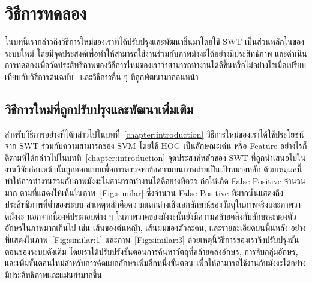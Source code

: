 \chapter{วิธีการทดลอง}
\label{chapter:experiment}

ในบทนี้เรากล่าวถึงวิธีการใหม่ของเราที่ได้ปรับปรุงและพัฒนาขึ้นมาโดยใช้ SWT เป็นส่วนหลักในของระบบใหม่ โดยมีจุดประสงค์เพื่อทำให้สามารถใช้งานร่วมกับภาพมังงะได้อย่างมีประสิทธิภาพ และดำเนินการทดลองเพื่อวัดประสิทธิภาพของวิธีการใหม่ของเราว่าสามารถทำงานได้ดีขึ้นหรือไม่อย่างไรเมื่อเปรียบเทียบกับวิธีการต้นฉบับ~\cite{5540041} และวิธีการอื่น ๆ ที่ถูกพัฒนามาก่อนหน้า

\section{วิธีการใหม่ที่ถูกปรับปรุงและพัฒนาเพิ่มเติม}

สำหรับวิธีการอย่างที่ได้กล่าวไปในบทที่~\ref{chapter:introduction} วิธีการใหม่ของเราได้ใช้ประโยชน์จาก SWT ร่วมกับความสามารถของ SVM โดยใช้ HOG เป็นลักษณะเด่น หรือ Feature อย่างไรก็ดีตามที่ได้กล่าวไปในบทที่~\ref{chapter:introduction} จุดประสงค์หลักของ SWT ที่ถูกนำเสนอไปในงานวิจัยก่อนหน้านั้นถูกออกแบบเพื่อการตรวจหาข้อความบนภาพถ่ายเป็นเป้าหมายหลัก ด้วยเหตุผลนี้ทำให้การทำงานร่วมกับภาพมังงะไม่สามารถทำงานได้ดีอย่างที่ควร ก่อให้เกิด False Positive จำนวนมาก ตามที่แสดงให้เห็นในภาพ~\ref{Fig:similar} ซึ่งจำนวน False Positive ที่มากนั้นแสดงถึงประสิทธิภาพที่ต่ำของระบบ สาเหตุหลักคือความแตกต่างเชิงเอกลักษณ์ของวัถตุในภาพจริงและภาพวาดมังงะ นอกจากนี้องค์ประกอบต่าง ๆ ในภาพวาดของมังงะนั้นยังมีความคล้ายคลึงกับลักษณะของตัวอักษรในภาพมากเกินไป เช่น เส้นของต้นหญ้า, เส้นผมของตัวละคน, และรายละเอียดบนพื้นหลัง อย่างที่แสดงในภาพ~\ref{Fig:similar:1} และภาพ~\ref{Fig:similar:3} ด้วยเหตุนี้วิธีการของเราจึงปรับปรุงขั้นตอนของระบบดังเดิม โดยเราได้ปรับปรังขั้นตอนการค้นหาวัตถุที่คล้ายคลึงอักษร, การจับกลุ่มอักษร, และเพิ่มขั้นตอนใหม่สำหรับการคัดแยกอักษรเพิ่มอีกหนึ่งขั้นตอน เพื่อให้สามารถใช้งานกับมังงะได้อย่างมีประสิทธิภาพและแม่นยำมากขึ้น

